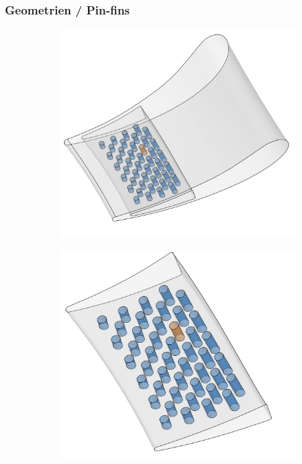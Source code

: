 \documentclass[8pt, aspectratio=169]{beamer}
\begin{document}
\begin{frame}
	\frametitle{Geometrien / Pin-fins}
	\vspace{-1cm}\hspace{-0.5cm}
	\begin{figure}[H]
		\centering
		\begin{subfigure}{.3\textwidth}
			\includegraphics[width=\textwidth]{../../tec/pinfin/10.png}
		\end{subfigure}
		\begin{subfigure}{.3\textwidth}
			\includegraphics[width=\textwidth]{../../tec/pinfin/11.png}

\end{subfigure}
\end{figure}
\end{frame}
\end{document}
